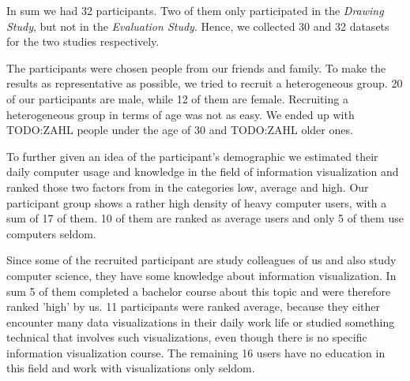 In sum we had 32 participants. Two of them only participated in the \textit{Drawing Study}, but not in the \textit{Evaluation Study}. Hence, we collected 30 and 32 datasets for the two studies respectively. \par \medskip

The participants were chosen people from our friends and family. To make the results as representative as possible, we tried to recruit a heterogeneous group. 20 of our participants are male, while 12 of them are female. Recruiting a heterogeneous group in terms of age was not as easy. We ended up with TODO:ZAHL people under the age of 30 and TODO:ZAHL older ones. \par \medskip

To further given an idea of the participant's demographic we estimated their daily computer usage and knowledge in the field of information visualization and ranked those two factors from in the categories low, average and high. Our participant group shows a rather high density of heavy computer users, with a sum of 17 of them. 10 of them are ranked as average users and only 5 of them use computers seldom. \par \medskip

Since some of the recruited participant are study colleagues of us and also study computer science, they have some knowledge about information visualization. In sum 5 of them completed a bachelor course about this topic and were therefore ranked 'high' by us. 11 participants were ranked average, because they either encounter many data visualizations in their daily work life or studied something technical that involves such visualizations, even though there is no specific information visualization course. The remaining 16 users have no education in this field and work with visualizations only seldom. \par \medskip

